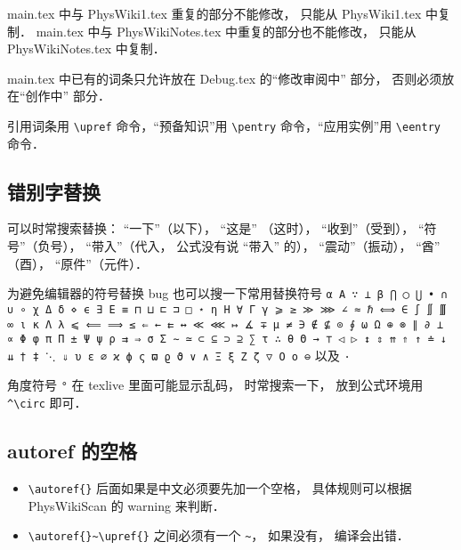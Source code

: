 main.tex 中与 PhysWiki1.tex 重复的部分不能修改， 只能从 PhysWiki1.tex 中复制． main.tex 中与 PhysWikiNotes.tex 中重复的部分也不能修改， 只能从 PhysWikiNotes.tex 中复制．

main.tex 中已有的词条只允许放在 Debug.tex 的“修改审阅中” 部分， 否则必须放在“创作中” 部分．

引用词条用 \verb|\upref| 命令，“预备知识”用 \verb|\pentry| 命令，“应用实例”用 \verb|\eentry| 命令．

\subsection{错别字替换}
可以时常搜索替换： “一下”（以下）， “这是” （这时）， “收到”（受到）， “符号”（负号）， “带入”（代入， 公式没有说 “带入” 的）， “震动”（振动）， “酋” （酉）， “原件”（元件）．

为避免编辑器的符号替换 bug 也可以搜一下常用替换符号 \verb|α Α ∵ ⊥ β ⋂ ◯ ⋃ • ∩ ∪ ∘ χ Δ δ ⋄ ϵ ∃ Ε ≡ ⊓ ⊔ ⊏ ⊐ □ ⋆ η Η ∀ Γ γ ⩾ ≥ ≫ ⋙ ∠ ≈ ℏ ⟺ ∈ ∫ ∬ ∭ ∞ ι κ Λ λ ⩽ ⟸ ⟹ ≤ ⇐ ← ⇇ ↔ ≪ ⋘ ↦ ∡ ∓ μ ≠ ∋ ∉ ⊈ ⊙ ∮ ω Ω ⊕ ⊗ ∥ ∂ ⟂ ∝ Φ φ π Π ± Ψ ψ ρ ⇉ ⇒ σ Σ ∼ ≃ ⊂ ⊆ ⊃ ⊇ ∑ τ ∴ θ Θ → ⊤ ◁ ▷ ↕ ⇕ ⇈ ⇑ ↑ ≐ ↓ ⇊ † ‡ ⋱ ⇓ υ ε ∅ ϰ ϕ ς ϖ ϱ ϑ ∨ ∧ Ξ ξ Ζ ζ ▽ Ο ο ⊖| 以及 \verb|·|

角度符号 \verb|°| 在 texlive 里面可能显示乱码， 时常搜索一下， 放到公式环境用 \verb|^\circ| 即可．

\subsection{autoref 的空格}
\begin{itemize}
\item \verb|\autoref{}| 后面如果是中文必须要先加一个空格， 具体规则可以根据 PhysWikiScan 的 warning 来判断．
\item \verb|\autoref{}~\upref{}| 之间必须有一个 \verb|~|， 如果没有， 编译会出错．
\end{itemize}
